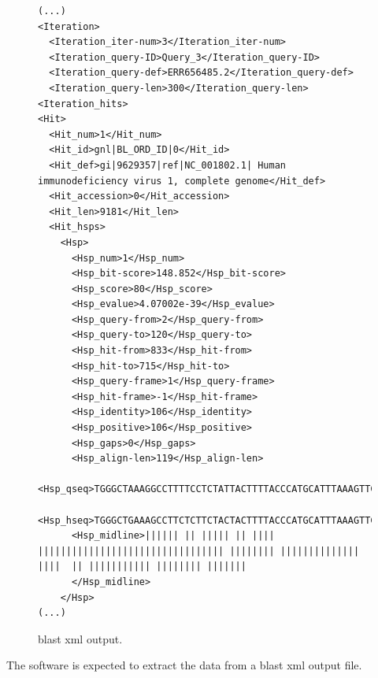 \begin{figure}[h!]
\begin{lstlisting}
(...)
<Iteration>
  <Iteration_iter-num>3</Iteration_iter-num>
  <Iteration_query-ID>Query_3</Iteration_query-ID>
  <Iteration_query-def>ERR656485.2</Iteration_query-def>
  <Iteration_query-len>300</Iteration_query-len>
<Iteration_hits>
<Hit>
  <Hit_num>1</Hit_num>
  <Hit_id>gnl|BL_ORD_ID|0</Hit_id>
  <Hit_def>gi|9629357|ref|NC_001802.1| Human immunodeficiency virus 1, complete genome</Hit_def>
  <Hit_accession>0</Hit_accession>
  <Hit_len>9181</Hit_len>
  <Hit_hsps>
    <Hsp>
      <Hsp_num>1</Hsp_num>
      <Hsp_bit-score>148.852</Hsp_bit-score>
      <Hsp_score>80</Hsp_score>
      <Hsp_evalue>4.07002e-39</Hsp_evalue>
      <Hsp_query-from>2</Hsp_query-from>
      <Hsp_query-to>120</Hsp_query-to>
      <Hsp_hit-from>833</Hsp_hit-from>
      <Hsp_hit-to>715</Hsp_hit-to>
      <Hsp_query-frame>1</Hsp_query-frame>
      <Hsp_hit-frame>-1</Hsp_hit-frame>
      <Hsp_identity>106</Hsp_identity>
      <Hsp_positive>106</Hsp_positive>
      <Hsp_gaps>0</Hsp_gaps>
      <Hsp_align-len>119</Hsp_align-len>
      <Hsp_qseq>TGGGCTAAAGGCCTTTTCCTCTATTACTTTTACCCATGCATTTAAAGTTCTAGGTGACATGGCCTGGTG(*@@*)TACCATTTGCCCTTGGAGATTTTGCACTATAGGATAATTTTGACTGACCT</Hsp_qseq>
      <Hsp_hseq>TGGGCTGAAAGCCTTCTCTTCTACTACTTTTACCCATGCATTTAAAGTTCTAGGTGATATGGCCTGATG(*@@*)TACCATTTGCCCCTGGATGTTCTGCACTATAGGGTAATTTTGGCTGACCT</Hsp_hseq>
      <Hsp_midline>|||||| || ||||| || |||| ||||||||||||||||||||||||||||||||| |||||||| |||||||||||||| ||||  || ||||||||||| |||||||| |||||||
      </Hsp_midline>
    </Hsp>
(...)
\end{lstlisting}
\caption{\acrshort{blast} \acrshort{xml} output.}\label{fig:xmlExample}
\end{figure}

The software is expected to extract the data from a \gls{blast} \gls{xml} output file.



